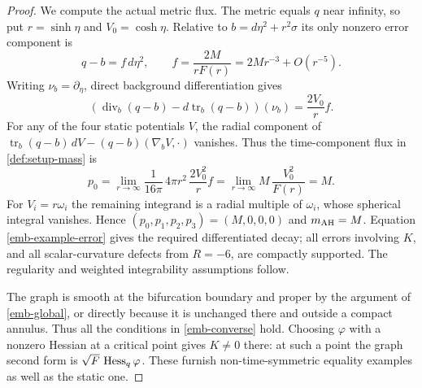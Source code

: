 \begin{proof}
We compute the actual metric flux.  The metric equals $q$ near
infinity, so put $r=\sinh\eta$ and $V_0=\cosh\eta$.  Relative
to $b=d\eta^2+r^2\sigma$ its only nonzero error component is
\begin{equation}
 q-b=f\,d\eta^2,\qquad
 f=\frac{2M}{rF(r)}
   =2Mr^{-3}+O(r^{-5}).
 \label{emb-example-error}
\end{equation}
Writing $\nu_b=\partial_\eta$, direct background differentiation
gives
\[
 (\operatorname{div}_b(q-b)-d\operatorname{tr}_b(q-b))(\nu_b)
       =\frac{2V_0}{r}f.
\]
For any of the four static potentials $V$, the radial component
of
$\operatorname{tr}_b(q-b)\,dV-(q-b)(\nabla_bV,\cdot)$
vanishes.  Thus the time-component flux in
\cref{def:setup-mass} is
\begin{equation}
 p_0=\lim_{r\to\infty}
       \frac{1}{16\pi}\,4\pi r^2\,
       \frac{2V_0^2}{r}f
     =\lim_{r\to\infty}M\,\frac{V_0^2}{F(r)}
     =M.
 \label{emb-example-mass}
\end{equation}
For $V_i=r\omega_i$ the remaining integrand is a radial multiple
of $\omega_i$, whose spherical integral vanishes.  Hence
$(p_0,p_1,p_2,p_3)=(M,0,0,0)$ and $m_{\mathrm{AH}}=M$.
Equation \eqref{emb-example-error} gives the required differentiated
decay; all errors involving $K$, and all scalar-curvature defects
from $R=-6$, are compactly supported.  The regularity and weighted
integrability assumptions follow.

The graph is smooth at the bifurcation boundary and proper by the
argument of \cref{emb-global}, or directly because it is unchanged
there and outside a compact annulus.  Thus all the conditions in
\cref{emb-converse} hold.  Choosing $\varphi$ with a nonzero Hessian
at a critical point gives $K\neq0$ there: at such a point the graph
second form is $\sqrt F\,\operatorname{Hess}_q\varphi$.  These furnish
non-time-symmetric equality examples as well as the static one.
\end{proof}

